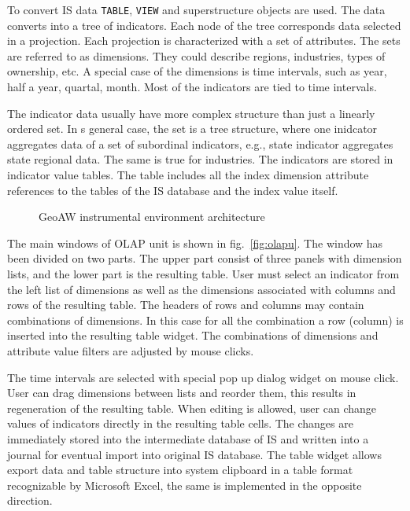 \documentclass[conference]{IEEEtran}
\begin{document}
To convert IS data \texttt{TABLE}, \texttt{VIEW} and superstructure objects are used.  The data converts into a tree of indicators.  Each node of the tree corresponds data selected in a projection.  Each projection is characterized with a set of attributes.  The sets are referred to as dimensions.  They could describe regions, industries, types of ownership, etc.  A special case of the dimensions is time intervals, such as year, half a year, quartal, month.  Most of the indicators are tied to time intervals.

The indicator data usually have more complex structure than just a linearly ordered set.  In s general case, the set is a tree structure, where one inidcator aggregates data of a set of subordinal indicators, e.g., state indicator aggregates state regional data.  The same is true for industries.  The indicators are stored in indicator value tables.  The table includes all the index dimension attribute references to the tables of the IS database and the index value itself.


\begin{figure}[b]
  \centering
  \begingroup
  \def\svgwidth{\linewidth}
  \tiny\sffamily
  \def\db{Database}
  \def\spec{Specification}
  \def\sce{\vtop{Specification\break Management}}
  \def\kerne{Kernel}
  \def\bde{\vtop{Database\break Editor}}
  \def\qb{\vtop{Query\break Builder}}
  \def\map{GIS}
  \def\gb{Graphic Base}
  \def\plug{Plugins}
  \def\intfs{\vtop{Plugin\break Interface}}
  
  \endgroup
  \caption{GeoAW instrumental environment architecture}
  \label{fig:architecture}
\end{figure}

The main windows of OLAP unit is shown in fig.~\ref{fig:olapu}.  The window has been divided on two parts.  The upper part consist of three panels with dimension lists, and the lower part is the resulting table.  User must select an indicator from the left list of dimensions as well as the dimensions associated with columns and rows of the resulting table.  The headers of rows and columns may contain combinations of dimensions.  In this case for all the combination a row (column) is inserted into the resulting table widget.  The combinations of dimensions and attribute value filters are adjusted by mouse clicks.

The time intervals are selected with special pop up dialog widget on mouse click.  User can drag dimensions between lists and reorder them, this results in regeneration of the resulting table.  When editing is allowed, user can change values of indicators directly in the resulting table cells.  The changes are immediately stored into the intermediate database of IS and written into a journal for eventual import into original IS database.  The table widget allows export data and table structure into system clipboard in a table format recognizable by Microsoft Excel, the same is implemented in the opposite direction.
\end{document}
